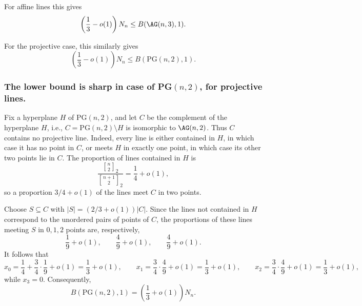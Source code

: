 \documentclass[10pt]{article}
\newcommand{\PG}{\mathrm{PG}}
\theoremstyle{definition}
\begin{document}
	For affine lines this gives
	\[
	\left(\frac13-o(1)\right)N_n
	\leq B(\AG(n,3),1).\]
	
	For the projective case, this similarly gives
	\[
	\left(\frac13-o(1)\right)N_n
	\leq B(\PG(n,2),1).\]
	
	\medskip
	\subsubsection{ The lower bound is sharp in case of PG$(n, 2)$, for projective lines.} %
	Fix a hyperplane
	\(H\) of \(\PG(n,2)\), and let
	\(C\) be the complement of the hyperplane \(H\), i.e.,
	\(
	C=\PG(n,2)\setminus H
	\) is isomorphic to \(\AG(n,2)\).
	Thus \(C\)  contains no projective
	line. Indeed, every line is either contained in \(H\), in which case it
	has no point in \(C\), or meets \(H\) in exactly one point, in which
	case its other two points lie in \(C\). The proportion of lines
	contained in \(H\) is
	\[
	\frac{{n\brack2}_2}{{n+1\brack2}_2}
	=\frac14+o(1),
	\]
	so a proportion \(3/4+o(1)\) of the lines meet \(C\) in two points.
	
	Choose \(S\subseteq C\) with
	\(|S|=(2/3+o(1))|C|\). Since the lines not contained in \(H\)
	correspond to the unordered pairs of points of \(C\), the proportions
	of these lines meeting \(S\) in \(0,1,2\) points are, respectively,
	\[
	\frac19+o(1),\qquad \frac49+o(1),\qquad \frac49+o(1).
	\]
	It follows that
	\[
	x_0=\frac14+ \frac34\cdot \frac19+o(1)=\frac13+o(1),\qquad
	x_1=\frac34\cdot \frac49+o(1)=\frac13+o(1),\qquad
	x_2=\frac34\cdot\frac49+o(1)=\frac13+o(1),
	\]
	while \(x_3=0\). Consequently,
	\[
	B(\PG(n,2),1)
	=\left(\frac13+o(1)\right)N_n.
	\]
	
\end{document}
